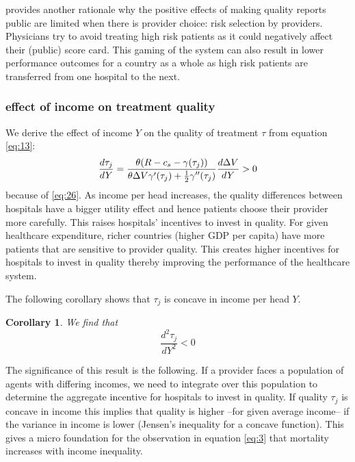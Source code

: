 \documentclass[a4paper,12pt]{article}
\newtheorem{corollary}{Corollary}
\begin{document}
\cite{dranoveReportCards2003} provides another rationale why the positive effects of making quality reports public are limited when there is provider choice: risk selection by providers. Physicians try to avoid treating high risk patients as it could negatively affect their (public) score card. This gaming of the system can also result in lower performance outcomes for a country as a whole as high risk patients are transferred from one hospital to the next.

\subsubsection{effect of income on treatment quality}
\label{sec:org91ec993}

We derive the effect of income \(Y\) on the quality of treatment \(\tau\) from equation \eqref{eq:13}: 
\begin{equation}
\label{eq:29}
\frac{d\tau_j}{dY} = \frac{\theta (R-c_s-\gamma(\tau_j))}{\theta \Delta V \gamma'(\tau_j) + \textstyle{1\over 2} \gamma''(\tau_j) } \frac{d\Delta V}{dY} > 0
\end{equation}
because of \eqref{eq:26}. As income per head increases, the quality differences between hospitals have a bigger utility effect and hence patients choose their provider more carefully. This raises hospitals' incentives to invest in quality. For given healthcare expenditure, richer countries (higher GDP per capita) have more patients that are sensitive to provider quality. This creates higher incentives for hospitals to invest in quality thereby improving the performance of the healthcare system.

The following corollary shows that \(\tau_j\) is concave in income per head \(Y\).

\begin{corollary}
\label{cor:tauY}
We find that
\begin{equation}
\label{eq:23}
\frac{d^2 \tau_j}{dY^2} < 0
\end{equation}
\end{corollary}

The significance of this result is the following. If a provider faces a population of agents with differing incomes, we need to integrate over this population to determine the aggregate incentive for hospitals to invest in quality. If quality \(\tau_j\) is concave in income this implies that quality is higher --for given average income-- if the variance in income is lower (Jensen's inequality for a concave function). This gives a micro foundation for the observation in equation \eqref{eq:3} that mortality increases with income inequality.
\end{document}
